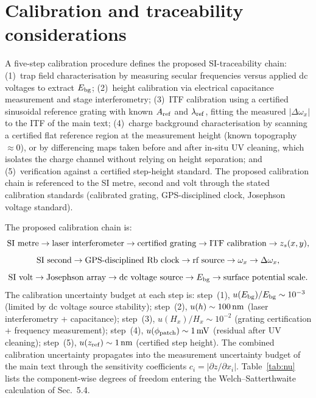 \documentclass[12pt,a4paper]{article}
\begin{document}
\section{Calibration and traceability considerations}

A five-step calibration procedure defines the proposed SI-traceability chain:
(1)~trap field characterisation by measuring secular frequencies versus
applied dc voltages to extract $E_{\rm bg}$;
(2)~height calibration via electrical capacitance measurement and stage
interferometry;
(3)~ITF calibration using a certified sinusoidal reference grating with
known $A_{\rm ref}$ and $\lambda_{\rm ref}$, fitting the measured $|\Delta\omega_x|$
to the ITF of the main text;
(4)~charge background characterisation by scanning a certified flat
reference region at the measurement height (known topography
$\approx0$), or by differencing maps taken before and after in-situ UV
cleaning, which isolates the charge channel without relying on height
separation;
and (5)~verification against a certified step-height standard.
The proposed calibration chain is referenced to the SI metre, second and
volt through the stated calibration standards (calibrated grating,
GPS-disciplined clock, Josephson voltage standard).

The proposed calibration chain is:
\[
\textup{SI metre} \to \textup{laser interferometer} \to \textup{certified grating}
\to \textup{ITF calibration} \to z_s(x,y),
\]
\[
\textup{SI second} \to \textup{GPS-disciplined Rb clock} \to
\textup{rf source} \to \omega_x \to \Delta\omega_x,
\]
\[
\textup{SI volt} \to \textup{Josephson array} \to \textup{dc voltage source}
\to E_{\rm bg} \to \textup{surface potential scale}.
\]
The calibration uncertainty budget at each step is:
step~(1), $u(E_{\rm bg})/E_{\rm bg} \sim 10^{-3}$ (limited by dc voltage
source stability); step~(2), $u(h) \sim 100\,\textup{nm}$ (laser interferometry
+ capacitance); step~(3), $u(H_x)/H_x \sim 10^{-2}$ (grating certification
+ frequency measurement); step~(4), $u(\phi_{\rm patch}) \sim 1\,\textup{mV}$
(residual after UV cleaning); step~(5), $u(z_{\rm ref}) \sim 1\,\textup{nm}$
(certified step height).
The combined calibration uncertainty propagates into the measurement
uncertainty budget of the main text through the sensitivity
coefficients $c_i = |\partial z/\partial x_i|$.  Table~\ref{tab:nu}
lists the component-wise degrees of freedom entering the
Welch--Satterthwaite calculation of Sec.~5.4.
\end{document}

